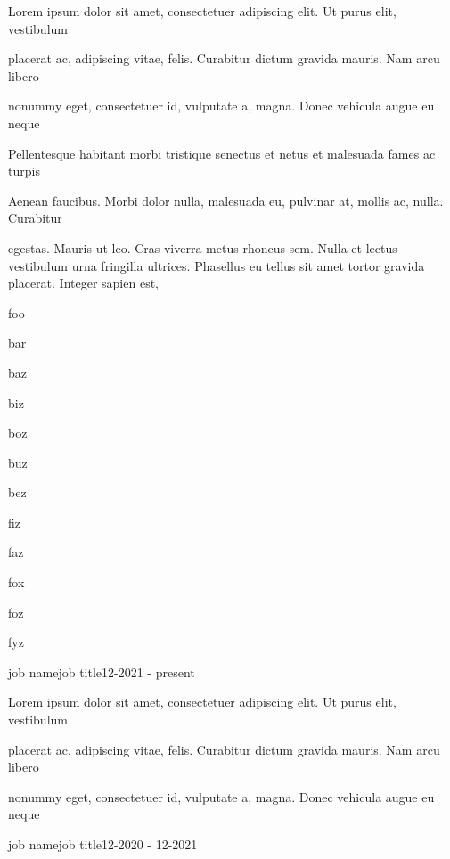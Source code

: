 \documentclass{resume}
\begin{document}
    \heading

    
    \lipsum[1]


    \begin{qualifications}
        \item Lorem ipsum dolor sit amet, consectetuer adipiscing elit. Ut purus elit, vestibulum
        \item placerat ac, adipiscing vitae, felis. Curabitur dictum gravida mauris. Nam arcu libero
        \item nonummy eget, consectetuer id, vulputate a, magna. Donec vehicula augue eu neque
        \item Pellentesque habitant morbi tristique senectus et netus et malesuada fames ac turpis
        \item Aenean faucibus. Morbi dolor nulla, malesuada eu, pulvinar at, mollis ac, nulla. Curabitur
        \item egestas. Mauris ut leo. Cras viverra metus rhoncus sem. Nulla et lectus vestibulum urna fringilla ultrices. Phasellus eu tellus sit amet tortor gravida placerat. Integer sapien est,
    
    \end{qualifications}


    \begin{skills}{4}
        \item foo
        \item bar
        \item baz
        \item biz
        \item boz
        \item buz
        \item bez
        \item fiz
        \item faz
        \item fox
        \item foz
        \item fyz
    \end{skills}

    
    \begin{job}{job name}{job title}{12-2021 - present}
        \begin{qualifications}
            \item Lorem ipsum dolor sit amet, consectetuer adipiscing elit. Ut purus elit, vestibulum
            \item placerat ac, adipiscing vitae, felis. Curabitur dictum gravida mauris. Nam arcu libero
            \item nonummy eget, consectetuer id, vulputate a, magna. Donec vehicula augue eu neque
        \end{qualifications}    
        \lipsum[2]
    \end{job}

    \begin{job}{job name}{job title}{12-2020 - 12-2021}
        \lipsum[2]
    \end{job}
    
\end{document}
